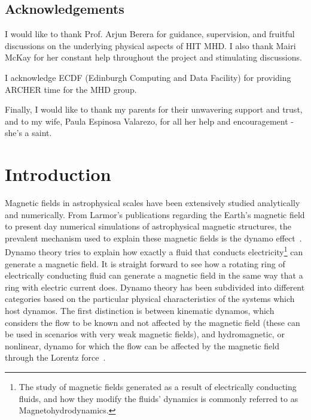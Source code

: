 \documentclass[12pt,a4paper]{report}
\begin{document}
\begin{titlepage}
\vspace*{2in}
\section*{Acknowledgements}

I would like to thank Prof. Arjun Berera for guidance, supervision, and fruitful discussions on the underlying physical aspects of HIT MHD. I also thank Mairi McKay for her constant help throughout the project and stimulating discussions.

I acknowledge ECDF (Edinburgh Computing and Data Facility) for providing ARCHER
time for the MHD group.

Finally, I would like to thank my parents for their unwavering support and trust, and to my wife, Paula Espinosa Valarezo, for all her help and encouragement - she's a saint. 

\end{titlepage}


\chapter{Introduction}

Magnetic fields in astrophysical scales have been extensively studied analytically and numerically. From Larmor's publications regarding the Earth's magnetic field to present day numerical simulations of astrophysical magnetic structures, the prevalent mechanism used to explain these magnetic fields is the dynamo effect~\cite{sir1919larmor}. Dynamo theory tries to explain how exactly a fluid that conducts electricity\footnote{The study of magnetic fields generated as a result of electrically conducting fluids, and how they modify the fluids' dynamics is commonly referred to as Magnetohydrodynamics.} can generate a magnetic field. It is straight forward to see how a rotating ring of electrically conducting fluid can generate a magnetic field in the same way that a ring with electric current does. Dynamo theory has been subdivided into different categories based on the particular physical characteristics of the systems which host dynamos. The first distinction is between kinematic dynamos, which considers the flow to be known and not affected by the magnetic field (these can be used in scenarios with very weak magnetic fields), and hydromagnetic, or nonlinear, dynamo for which the flow can be affected by the magnetic field through the Lorentz force~\cite{brandenburg2007hydromagnetic}.
\end{document}
